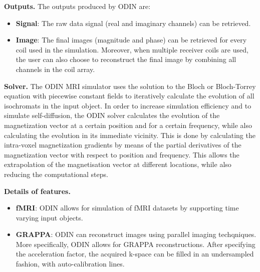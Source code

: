 \hfill

\textbf{Outputs.} The outputs produced by ODIN are:
\begin{itemize}
    
    \item \textbf{Signal}: The raw data signal (real and imaginary channels) can be retrieved.
    
    \item \textbf{Image}: The final images  (magnitude  and phase) can be retrieved for every coil used in the simulation.
    Moreover, when multiple receiver coils are used, the user can also choose to reconstruct the final image by combining all channels in the coil array.
    
\end{itemize}

\hfill

\textbf{Solver.} The ODIN MRI simulator uses the solution 
to the Bloch or Bloch-Torrey equation with piecewise constant fields to iteratively calculate the evolution of all isochromats in the input object.
In order to increase simulation efficiency and to simulate self-diffusion, the ODIN solver calculates the evolution of the magnetization vector at a certain position and for a certain frequency, while also calculating the evolution in its immediate vicinity.
This is done by calculating the intra-voxel magnetization gradients by means of the partial derivatives of the magnetization vector with respect to position and frequency.
This allows the extrapolation of the magnetisation vector at different locations, while also reducing the computational steps.

\hfill

\textbf{Details of features.}
\begin{itemize}
    
    \item \textbf{fMRI}: ODIN allows for simulation of fMRI datasets by supporting time varying input objects.
    
    \item \textbf{GRAPPA}: ODIN can reconstruct images using parallel imaging techqniques.
    More specifically, ODIN allows for GRAPPA reconstructions.
    After specifying the acceleration factor, the acquired k-space can be filled in an undersampled fashion, with auto-calibration lines.
    
\end{itemize}

\hfill

